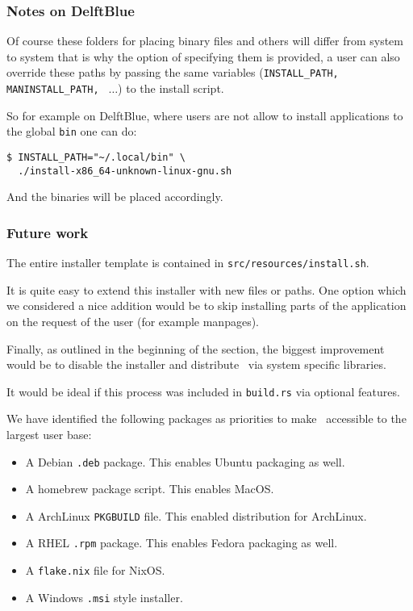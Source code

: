 \subsubsection{Notes on DelftBlue}
\label{sec:installexample2}

Of course these folders for placing binary files and others will differ from system to system
that is why the option of specifying them is provided, a user can also override these paths by
passing the same variables (\texttt{INSTALL\_PATH, MANINSTALL\_PATH, } $\dots$) to the install script.

So for example on DelftBlue, where users are not allow to install applications
to the global \texttt{bin} one can do:

\begin{verbatim}
$ INSTALL_PATH="~/.local/bin" \
  ./install-x86_64-unknown-linux-gnu.sh
\end{verbatim}

And the binaries will be placed accordingly.

\subsubsection{Future work}

The entire installer template is contained in \texttt{src/resources/install.sh}.

It is quite easy to extend this installer with new files or paths. One option which
we considered a nice addition would be to skip installing parts of the application
on the request of the user (for example manpages).

Finally, as outlined in the beginning of the section, the biggest improvement
would be to disable the installer and distribute \gourd\ via system specific libraries.

It would be ideal if this process was included in \texttt{build.rs} via optional features.

We have identified the following packages as priorities to make \gourd\ accessible
to the largest user base:
\begin{itemize}
  \item A Debian \texttt{.deb} package. This enables Ubuntu packaging as well.
  \item A homebrew package script. This enables MacOS.
  \item A ArchLinux \texttt{PKGBUILD} file. This enabled distribution for ArchLinux.
  \item A RHEL \texttt{.rpm} package. This enables Fedora packaging as well.
  \item A \texttt{flake.nix} file for NixOS.
  \item A Windows \texttt{.msi} style installer.
\end{itemize}
